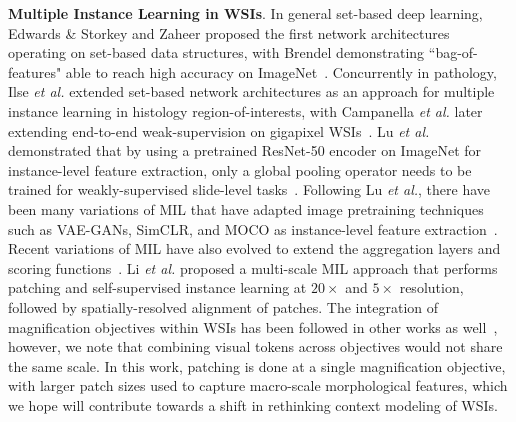 {\textbf{Multiple Instance Learning in WSIs}. In general set-based deep learning, Edwards \& Storkey and Zaheer \etal proposed the first network architectures operating on set-based data structures, with Brendel \etal demonstrating ``bag-of-features" able to reach high accuracy on ImageNet~\cite{DBLP:conf/iclr/EdwardsS17, zaheer2017deep, DBLP:conf/iclr/BrendelB19}. Concurrently in pathology, Ilse \textit{et al.} extended set-based network architectures as an approach for multiple instance learning in histology region-of-interests, with Campanella \textit{et al.} later extending end-to-end weak-supervision on gigapixel WSIs~\cite{ilse2018attention, campanella2019clinical}. Lu \textit{et al.} demonstrated that by using a pretrained ResNet-50 encoder on ImageNet for instance-level feature extraction, only a global pooling operator needs to be trained for weakly-supervised slide-level tasks~\cite{lu2020data}. Following Lu \textit{et al.}, there have been many variations of MIL that have adapted image pretraining techniques such as VAE-GANs, SimCLR, and MOCO as instance-level feature extraction~\cite{zhao2020predicting, li2021dual, saillard2021self}. Recent variations of MIL have also evolved to extend the aggregation layers and scoring functions~\cite{zhu2017wsisa, xu2019camel, tellez2019neural, shao2021transmil, yao2019deep, yao2020whole, chen2021multimodal}. Li \textit{et al.} proposed a multi-scale MIL approach that performs patching and self-supervised instance learning at $20\times$ and $5\times$ resolution, followed by spatially-resolved alignment of patches\cite{li2021dual}. The integration of magnification objectives within WSIs has been followed in other works as well~\cite{hashimoto2020multi, marini2021multi, meng2021hierarchical, gao2016multi}, however, we note that combining visual tokens across objectives would not share the same scale. In this work, patching is done at a single magnification objective, with larger patch sizes used to capture macro-scale morphological features, which we hope will contribute towards a shift in rethinking context modeling of WSIs.

}
